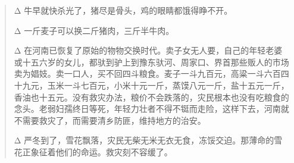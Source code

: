 \begin{quote}
\begin{description}
		\item {\Add Δ} 牛早就快杀光了，猪尽是骨头，鸡的眼睛都饿得睁不开。\\

		\item {\Add Δ} 一斤麦子可以换二斤猪肉，三斤半牛肉。\\

		\item {\Add Δ} 在河南已恢复了原始的物物交换时代。卖子女无人要，自己的年轻老婆或十五六岁的女儿，都驮到驴上到豫东驮河、周家口、界首那些贩人的市场卖为娼妓。卖一口人，买不回四斗粮食。麦子一斗九百元，高粱一斗六百四十九元，玉米一斗七百元，小米十元一斤，蒸馍八元一斤，盐十五元一斤，香油也十五元。没有救灾办法，粮价不会跌落的，灾民根本也没有吃粮食的念头。老弱妇孺终日等死，年轻力壮者不得不铤而走险，这样下去，河南就不需要救灾了，而需要清乡防匪，维持地方的治安。\\

		\item {\Add Δ} 严冬到了，雪花飘落，灾民无柴无米无衣无食，冻馁交迫。那薄命的雪花正象征着他们的命运。救灾刻不容缓了。\\
	\end{description}
\end{quote}
